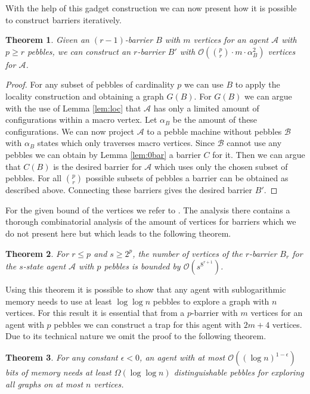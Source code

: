 \documentclass[oneside]{scrartcl}
\newtheorem{thm}{Theorem}
\begin{document}
With the help of this gadget construction we can now present how it is possible
to construct barriers iteratively.
\begin{thm}
  Given an $(r-1)$-barrier $B$ with $m$ vertices for an agent $\mathcal{A}$
  with $p\geq r$ pebbles, we can construct an $r$-barrier $B'$ with
  $\mathcal{O}({{p}\choose{r}}\cdot m\cdot \alpha_{B}^{2})$ vertices for
  $\mathcal{A}$.
\end{thm}
\begin{proof}
  For any subset of pebbles of cardinality $p$ we can use $B$ to apply the
  locality construction and obtaining a graph $G(B)$. For $G(B)$ we can argue
  with the use of Lemma \ref{lem:loc} that $\mathcal{A}$ has only a limited
  amount of configurations within a macro vertex. Let $\alpha_{B}$ be the
  amount of these configurations. We can now project $\mathcal{A}$ to a pebble
  machine without pebbles $\mathcal{B}$ with $\alpha_{B}$ states which only
  traverses macro vertices. Since $\mathcal{B}$ cannot use any pebbles we can
  obtain by Lemma \ref{lem:0bar} a barrier $C$ for it. Then we can argue that
  $C(B)$ is the desired barrier for $\mathcal{A}$ which uses only the chosen
  subset of pebbles. For all ${p}\choose{r}$ possible subsets of pebbles a
  barrier can be obtained as described above. Connecting these barriers gives
  the desired barrier $B'$.
\end{proof}
For the given bound of the vertices we refer to \cite{pebbles}. The
analysis there contains a thorough combinatorial analysis of the amount of
vertices for barriers which we do not present here but which leads to the
following theorem.
\begin{thm}
  For $r\leq p$ and $s \geq 2^{p}$, the number of vertices of the $r$-barrier
  $B_{r}$ for the $s$-state agent $\mathcal{A}$ with $p$ pebbles is bounded by
  $\mathcal{O}(s^{8^{r+1}})$.
\end{thm}

Using this theorem it is possible to show that any agent with sublogarithmic
memory needs to use at least $\log\log n$ pebbles to explore a graph with $n$
vertices. For this result it is essential that from a $p$-barrier with $m$
vertices for an agent with $p$ pebbles we can construct a trap for this agent
with $2m+4$ vertices. Due to its technical nature we omit the proof to the
following theorem.
\begin{thm}
  For any constant $\epsilon < 0$, an agent with at most
  $\mathcal{O}((\log n)^{1-\epsilon})$ bits of memory needs at least
  $\Omega(\log\log n)$ distinguishable pebbles for exploring all graphs on at
  most $n$ vertices.
\end{thm}
\end{document}
